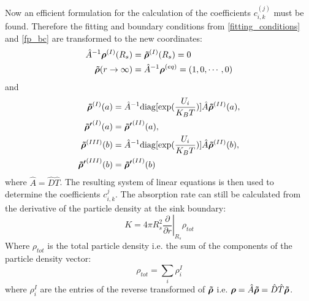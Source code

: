 Now an efficient formulation for the calculation of the coefficients $c_{i,k}^{(j)}$ must be found. Therefore the fitting and boundary conditions from \eqref{fitting_conditions} and \eqref{fp_bc} are transformed to the new coordinates:
\begin{align}
    \hat{A}^{-1}\boldsymbol{\mathbf{\rho}}^{(I)}(R_s) &= \boldsymbol{\mathbf{\tilde{\rho}}}^{(I)}(R_s) = 0 \nonumber \\
    \boldsymbol{\mathbf{\tilde{\rho}}}(r \rightarrow \infty) &= \hat{A}^{-1} \boldsymbol{\mathbf{\rho}}^{(eq)} = (1,0,\cdots,0)
\end{align}
and
\begin{align}
    \boldsymbol{\mathbf{\tilde{\rho}}}^{(I)}(a) &= \hat{A}^{-1}\mathrm{diag}[\exp(\frac{U_i}{K_B T})]\hat{A} \boldsymbol{\mathbf{\tilde{\rho}}}^{(II)}(a), \\ \nonumber
    \boldsymbol{\mathbf{\tilde{\rho} '}}^{(I)}(a) &= \boldsymbol{\mathbf{\tilde{\rho} '}}^{(II)}(a), \\ \nonumber
    \boldsymbol{\mathbf{\tilde{\rho}}}^{(III)}(b) &= \hat{A}^{-1}\mathrm{diag}[\exp(\frac{U_i}{K_B T})]\hat{A} \boldsymbol{\mathbf{\tilde{\rho}}}^{(II)}(b), \\ \nonumber
    \boldsymbol{\mathbf{\tilde{\rho} '}}^{(III)}(b) &= \boldsymbol{\mathbf{\tilde{\rho} '}}^{(II)}(b)
\end{align}
where $\hat{A} = \hat{D}\hat{T}$.
The resulting system of linear equations is then used to determine the coefficients $c_{i,k}^{j}$. The absorption rate can still be calculated from the derivative of the particle density at the sink boundary:
\begin{equation}
    K = 4 \pi R_s^2 \left. \frac{\partial}{\partial r} \right|_{R_s} \rho_{tot} 
\end{equation}
Where $\rho_{tot}$ is the total particle density i.e. the sum of the components of the particle density vector:
\begin{equation}
    \rho_{tot} =  \sum_{i} \rho^{I}_{i}
\end{equation}
where $\rho^{I}_{i}$ are the entries of the reverse transformed of $\boldsymbol{\mathbf{\tilde{\rho}}}$ i.e. $\boldsymbol{\mathbf{\rho}} = \hat{A} \boldsymbol{\mathbf{\tilde{\rho}}} = \hat{D}\hat{T} \boldsymbol{\mathbf{\tilde{\rho}}}$.
